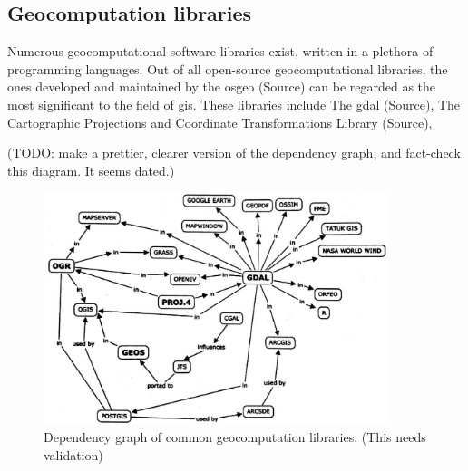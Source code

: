 






\subsection{Geocomputation libraries}
Numerous geocomputational software libraries exist, written in a plethora of programming languages. 
Out of all open-source geocomputational libraries, the ones developed and maintained by the \ac{osgeo} (Source) can be regarded as the most significant to the field of \ac{gis}. 
These libraries include The \ac*{gdal} (Source), The Cartographic Projections and Coordinate Transformations Library (Source),  


\begin{note}
  (TODO: make a prettier, clearer version of the dependency graph, and fact-check this diagram. It seems dated.)
\end{note}

\begin{figure}
  \centering
  \graphicspath{ {../../assets/images/background} }
  \includegraphics[width=380px]{all-geo-libraries-explained.jpg}
  \caption{Dependency graph of common geocomputation libraries. (This needs validation) }
  \label{fig:geolib-dependencies}
\end{figure}



